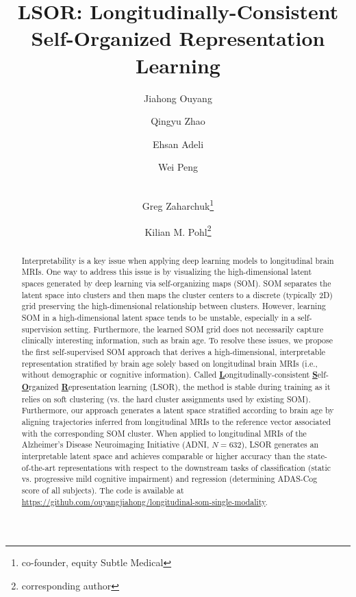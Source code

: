 \documentclass[runningheads]{llncs}
\begin{document}
\title{LSOR: Longitudinally-Consistent Self-Organized Representation Learning}

%
\author{
Jiahong Ouyang\inst{} \and
Qingyu Zhao\inst{} \and
Ehsan Adeli\inst{} \and
Wei Peng\inst{} \and
\\Greg Zaharchuk\inst{}\thanks{co-founder, equity Subtle Medical} \and
Kilian M. Pohl\inst{}\thanks{corresponding author}}
% 

\maketitle              %
%
\begin{abstract}
Interpretability is a key issue when applying deep learning models to longitudinal brain MRIs. One way to address this issue is by visualizing the high-dimensional latent spaces generated by deep learning via self-organizing maps (SOM). SOM separates the latent space into clusters and then maps the cluster centers to a discrete (typically 2D) grid preserving the high-dimensional relationship between clusters. However, learning SOM in a high-dimensional latent space tends to be unstable, especially in a self-supervision setting. Furthermore, the learned SOM grid does not necessarily capture clinically interesting information, such as brain age. To resolve these issues, we propose the first self-supervised SOM approach that derives a high-dimensional, interpretable representation stratified by brain age solely based on longitudinal brain MRIs (i.e., without demographic or cognitive information). Called \textbf{\underline{L}}ongitudinally-consistent \textbf{\underline{S}}elf-\textbf{\underline{O}}rganized \textbf{\underline{R}}epresentation learning (LSOR), the method is stable during training as it relies on soft clustering (vs. the hard cluster assignments used by existing SOM). Furthermore, our approach generates a latent space stratified according to brain age by aligning trajectories inferred from longitudinal MRIs to the reference vector associated with the corresponding SOM cluster. When applied to longitudinal MRIs of the Alzheimer's Disease Neuroimaging Initiative (ADNI, $N=632$), LSOR generates an interpretable latent space and achieves comparable or higher accuracy than the state-of-the-art representations with respect to the downstream tasks of classification (static vs. progressive mild cognitive impairment) and regression (determining ADAS-Cog score of all subjects). The code is available at \url{https://github.com/ouyangjiahong/longitudinal-som-single-modality}.
\end{abstract}
%
%
\end{document}
